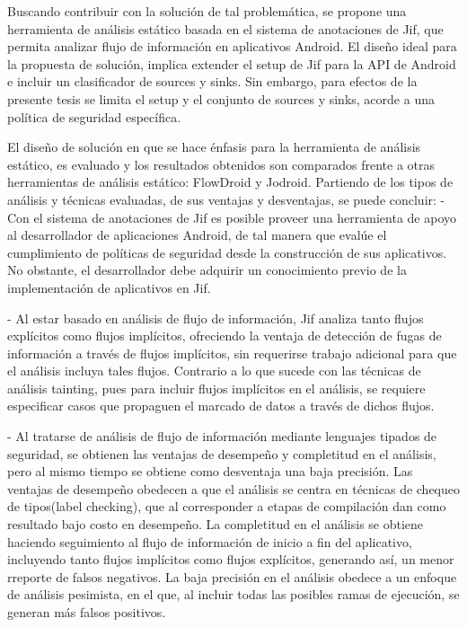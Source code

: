 Buscando contribuir con la solución de tal problemática, se propone una
herramienta de análisis estático basada en el sistema de anotaciones de Jif, que
permita analizar flujo de información en aplicativos Android. El diseño ideal
para la propuesta de solución, implica extender el setup de Jif para la API de
Android e incluir un clasificador de sources y sinks. Sin embargo, para efectos
de la presente tesis se limita el setup y el conjunto de sources y sinks, acorde
a una política de seguridad específica.

El diseño de solución en que se hace énfasis para la herramienta de análisis
estático, es evaluado y los resultados obtenidos son comparados frente a otras
herramientas de análisis estático: FlowDroid y Jodroid. Partiendo de los tipos
de análisis y técnicas evaluadas, de sus ventajas y desventajas, se
puede concluir:\newline 
- Con el sistema de anotaciones de Jif es posible proveer una
herramienta de apoyo al desarrollador de aplicaciones Android, de tal manera que evalúe el
cumplimiento de políticas de seguridad desde la construcción de sus aplicativos.\\
No obstante, el desarrollador debe adquirir un conocimiento previo de la
implementación de aplicativos en Jif.

- Al estar basado en análisis de flujo de información, Jif analiza tanto flujos
explícitos como flujos implícitos, ofreciendo la ventaja de detección de fugas
de información a través de flujos implícitos, sin requerirse trabajo adicional
para que el análisis incluya tales flujos. Contrario a lo que sucede con las
técnicas de análisis tainting, pues para incluir flujos implícitos en el
análisis, se requiere especificar casos que propaguen el marcado de datos a
través de dichos flujos.

- Al tratarse de análisis de flujo de información mediante lenguajes tipados de
seguridad, se obtienen las ventajas de desempeño y completitud en el análisis,
pero al mismo tiempo se obtiene como desventaja una baja precisión.\newline 
Las ventajas de desempeño obedecen a que el análisis se centra en técnicas de
chequeo de tipos(label checking), que al corresponder a etapas de compilación
dan como resultado bajo costo en desempeño.\newline
La completitud en el análisis se obtiene  haciendo seguimiento al flujo de
información de inicio a fin del aplicativo\cite{LanguageIFS-2013}, incluyendo
tanto flujos implícitos como flujos explícitos, generando así, un menor
rreporte de falsos negativos.\newline 
La baja precisión en el análisis obedece a
un enfoque de análisis pesimista, en el que, al incluir todas las posibles ramas de ejecución, se generan más
falsos positivos.

